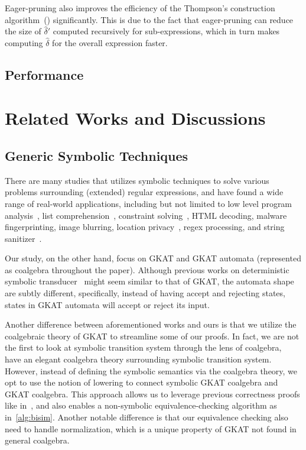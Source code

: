 \documentclass[conference]{IEEEtran}
\begin{document}
Eager-pruning also improves the efficiency of the Thompson's construction algorithm~() significantly. This is due to the fact that eager-pruning can reduce the size of \(\hat{\delta}'\) computed recursively for sub-expressions, which in turn makes computing \(\hat{\delta}\) for the overall expression faster.

\subsection{Performance}\label{sec:performance-implementation}


\section{Related Works and Discussions}

\subsection{Generic Symbolic Techniques}

There are many studies that utilizes symbolic techniques to solve various problems surrounding (extended) regular expressions, and have found a wide range of real-world applications, including but not limited to low level program analysis~\cite{dallapreda_AbstractSymbolicAutomata_2015a}, list comprehension~\cite{saarikivi_FusingEffectfulComprehensions_2017}, constraint solving~\cite{stanford_SymbolicBooleanDerivatives_2021}, HTML decoding, malware fingerprinting, image blurring, location privacy~\cite{veanes_SymbolicFiniteState_2012}, regex processing, and string sanitizer~\cite{veanes_ApplicationsSymbolicFinite_2013}.

Our study, on the other hand,  focus on GKAT and GKAT automata (represented as coalgebra throughout the paper). 
Although previous works on deterministic symbolic transducer~\cite{saarikivi_FusingEffectfulComprehensions_2017,veanes_SymbolicFiniteState_2012} might seem similar to that of GKAT, the automata shape are subtly different, specifically, instead of having accept and rejecting states, states in GKAT automata will accept or reject its input.

Another difference between aforementioned works and ours is that we utilize the coalgebraic theory of GKAT to streamline some of our proofs.
In fact, we are not the first to look at symbolic transition system through the lens of coalgebra, \citeauthor{bonchi_CoalgebraicSymbolicSemantics_2009}~\cite{bonchi_CoalgebraicSymbolicSemantics_2009} have an elegant coalgebra theory surrounding symbolic transition system.
However, instead of defining the symbolic semantics via the coalgebra theory, we opt to use the notion of lowering to connect symbolic GKAT coalgebra and GKAT coalgebra.
This approach allows us to leverage previous correctness proofs like in~, and also enables a non-symbolic equivalence-checking algorithm as in~\cref{alg:bisim}.
Another notable difference is that our equivalence checking also need to handle normalization, which is a unique property of GKAT not found in general coalgebra.
\end{document}
